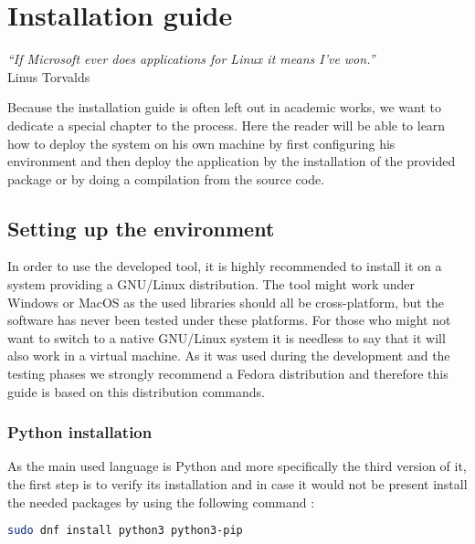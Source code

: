 

\chapter{Installation guide} %
\label{chap:installation}
\begin{flushright}
\textit{``If Microsoft ever does applications for Linux it means I've won.''} \\ Linus Torvalds
\end{flushright}


Because the installation guide is often left out in academic works, we want to dedicate a special chapter to the process. Here the reader will be able to learn how to deploy the system on his own machine by first configuring his environment and then deploy the application by the installation of the provided package or by doing a compilation from the source code.

\section {Setting up the environment}

In order to use the developed tool, it is highly recommended to install it on a system providing a GNU/Linux distribution. The tool might work under Windows or MacOS as the used libraries should all be cross-platform, but the software has never been tested under these platforms. For those who might not want to switch to a native GNU/Linux system it is needless to say that it will also work in a virtual machine. As it was used during the development and the testing phases we strongly recommend a Fedora distribution and therefore this guide is based on this distribution commands.

\subsection{Python installation}

As the main used language is Python and more specifically the third version of it, the first step is to verify its installation and in case it would not be present install the needed packages by using the following command :
\begin{lstlisting}[language=bash]
sudo dnf install python3 python3-pip
\end{lstlisting}

